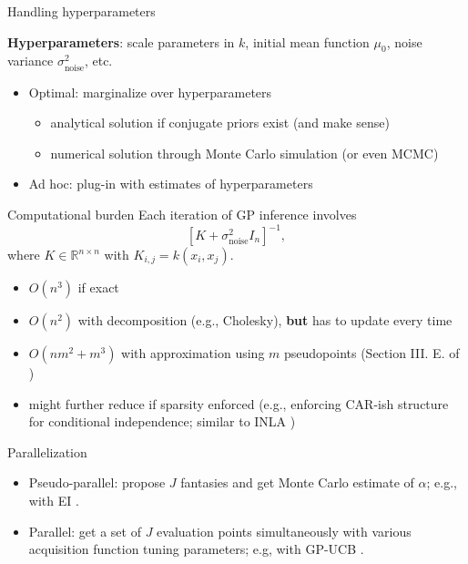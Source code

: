 \documentclass[aspectratio=169]{beamer}					%
\begin{document}
\begin{frame}{Handling hyperparameters}
	
	\textbf{Hyperparameters}: scale parameters in $k$, initial mean function $\mu_0$, noise variance $\sigma^2_{\text{noise}}$, etc.
	
	\vspace{1em}
	
	\begin{itemize}
		\item Optimal: marginalize over hyperparameters
		\begin{itemize}
			\item analytical solution if conjugate priors exist (and make sense)
			\item numerical solution through Monte Carlo simulation (or even MCMC)
		\end{itemize}
	\item Ad hoc: plug-in with estimates of hyperparameters
	\end{itemize}
	
\end{frame}

\begin{frame}{Computational burden}
	Each iteration of GP inference involves 
	\begin{equation*}
		\left[K + \sigma^2_{\text{noise}}I_n\right]^{-1},
	\end{equation*}
where $K \in \mathbb{R}^{n \times n}$ with $K_{i,j} = k(x_i, x_j)$. 	

\pause
\vspace{1em}

\begin{itemize}
	\item $O(n^3)$ if exact
	\item $O(n^2)$ with decomposition (e.g., Cholesky), \textbf{but} has to update every time
	\item $O(nm^2 + m^3)$ with approximation using $m$ pseudopoints (Section III. E. of \cite{shahriari2015taking}) 
	\item might further reduce if sparsity enforced (e.g., enforcing CAR-ish structure for conditional independence; similar to INLA \cite{rue2017bayesian})
\end{itemize}
\end{frame}

\begin{frame}{Parallelization}
	
	\begin{itemize}
		\item Pseudo-parallel: propose $J$ fantasies and get Monte Carlo estimate of $\alpha$; e.g., with EI \cite{snoek2012practical}. 
		\item Parallel: get a set of $J$ evaluation points simultaneously with various acquisition function tuning parameters; e.g, with GP-UCB \cite{hutter2012parallel, jones2001taxonomy}. 
		\end{itemize}
	
\end{frame}
\end{document}
